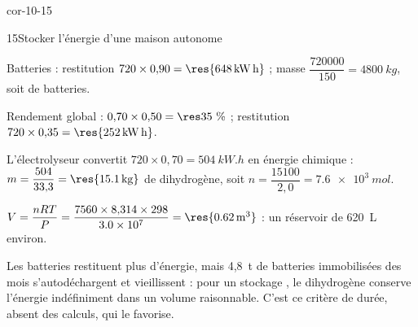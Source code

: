 \begin{blocLivre}{cor-10-15}
\begin{corrige}{15}{Stocker l'énergie d'une maison autonome}
\begin{questions}
\item Batteries : restitution $720\times0{,}90=\res{\qty{648}{kW.h}}$ ; masse
$\dfrac{\num{720000}}{150}=\qty{4800}{kg}$, soit  de batteries.
\item Rendement global : $0{,}70\times0{,}50=\res{35~\%}$ ; restitution $720\times0{,}35=\res{\qty{252}{kW.h}}$.
\item L'électrolyseur convertit $720\times0{,}70=\qty{504}{kW.h}$ en énergie chimique :
$m=\dfrac{504}{33{,}3}=\res{\qty{15,1}{kg}}$ de dihydrogène, soit $n=\dfrac{\num{15100}}{2{,}0}=\qty{7,6e3}{mol}$.
\item $V=\dfrac{nRT}{P}=\dfrac{7560\times8{,}314\times298}{\num{3.0e7}}=\res{\qty{0,62}{m^3}}$ : un réservoir de
620~L environ.
\item Les batteries restituent plus d'énergie, mais 4,8~t de batteries immobilisées des mois s'autodéchargent et
vieillissent : pour un stockage , le dihydrogène conserve l'énergie indéfiniment dans un volume
raisonnable. C'est ce critère de durée, absent des calculs, qui le favorise.
\end{questions}
\end{corrige}
\end{blocLivre}
